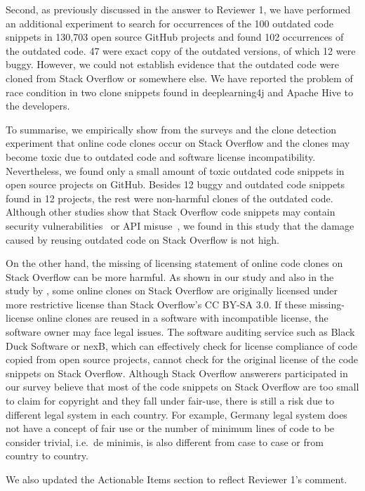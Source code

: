\documentclass[a4paper,twoside,10pt]{reviewresponse}
\begin{document}
Second, as previously discussed in the answer to Reviewer 1, we have performed an additional experiment to search for occurrences of the 100 outdated code snippets in 130,703 open source GitHub projects and found 102 occurrences of the outdated code. 47 were exact copy of the outdated versions, of which 12 were buggy. However, we could not establish evidence that the outdated code were cloned from Stack Overflow or somewhere else. We have reported the problem of race condition in two clone snippets found in deeplearning4j and Apache Hive to the developers.

To summarise, we empirically show from the surveys and the clone detection experiment that online code clones occur on Stack Overflow and the clones may become toxic due to outdated code and software license incompatibility. 
Nevertheless, we found only a small amount of toxic outdated code snippets in open source projects on GitHub. Besides 12 buggy and outdated code snippets found in 12 projects, the rest were non-harmful clones of the outdated code. Although other studies show that Stack Overflow code snippets may contain security vulnerabilities~\citep{Acar2016,Fischer2017} or API misuse~\citep{Zhang2018}, we found in this study that the damage caused by reusing outdated code on Stack Overflow is not high. 

On the other hand, the missing of licensing statement of online code clones on Stack Overflow can be more harmful. As shown in our study and also in the study by \cite{An2017}, some online clones on Stack Overflow are originally licensed under more restrictive license than Stack Overflow's CC BY-SA 3.0. If these missing-license online clones are reused in a software with incompatible license, the software owner may face legal issues. The software auditing service such as Black Duck Software or nexB, which can effectively check for license compliance of code copied from open source projects, cannot check for the original license of the code snippets on Stack Overflow. Although Stack Overflow answerers participated in our survey believe that most of the code snippets on Stack Overflow are too small to claim for copyright and they fall under fair-use, there is still a risk due to different legal system in each country. For example, Germany legal system does not have a concept of fair use or the number of minimum lines of code to be consider trivial, i.e.~de minimis, is also different from case to case or from country to country. 

We also updated the Actionable Items section to reflect Reviewer 1's comment.
\end{document}
